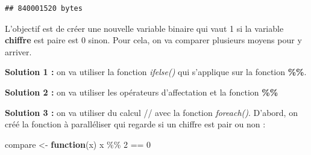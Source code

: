 \documentclass[
]{book}
\newenvironment{Shaded}{\begin{snugshade}}{\end{snugshade}}
\newcommand{\AttributeTok}[1]{\textcolor[rgb]{0.77,0.63,0.00}{#1}}
\newcommand{\ControlFlowTok}[1]{\textcolor[rgb]{0.13,0.29,0.53}{\textbf{#1}}}
\newcommand{\DecValTok}[1]{\textcolor[rgb]{0.00,0.00,0.81}{#1}}
\newcommand{\FunctionTok}[1]{\textcolor[rgb]{0.00,0.00,0.00}{#1}}
\newcommand{\NormalTok}[1]{#1}
\newcommand{\OtherTok}[1]{\textcolor[rgb]{0.56,0.35,0.01}{#1}}
\newcommand{\SpecialCharTok}[1]{\textcolor[rgb]{0.00,0.00,0.00}{#1}}
\theoremstyle{definition}
\theoremstyle{definition}
\theoremstyle{definition}
\theoremstyle{definition}
\theoremstyle{remark}
\begin{document}
\begin{verbatim}
## 840001520 bytes
\end{verbatim}

L'objectif est de créer une nouvelle variable binaire qui vaut 1 si la variable \textbf{chiffre} est paire est 0 sinon. Pour cela, on va comparer plusieurs moyens pour y arriver.

\textbf{Solution 1 :} on va utiliser la fonction \emph{ifelse()} qui s'applique sur la fonction \textbf{\%\%}.

\begin{Shaded}
\end{Shaded}

\textbf{Solution 2 :} on va utiliser les opérateurs d'affectation et la fonction \textbf{\%\%}

\begin{Shaded}
\end{Shaded}

\textbf{Solution 3 :} on va utiliser du calcul // avec la fonction \emph{foreach()}. D'abord, on créé la fonction à paralléliser qui regarde si un chiffre est pair ou non :

\begin{Shaded}
\begin{Highlighting}[]
\NormalTok{compare }\OtherTok{\textless{}{-}} \ControlFlowTok{function}\NormalTok{(x)}
\NormalTok{  x }\SpecialCharTok{\%\%} \DecValTok{2} \SpecialCharTok{==} \DecValTok{0} 
\end{Highlighting}
\end{Shaded}
\end{document}

